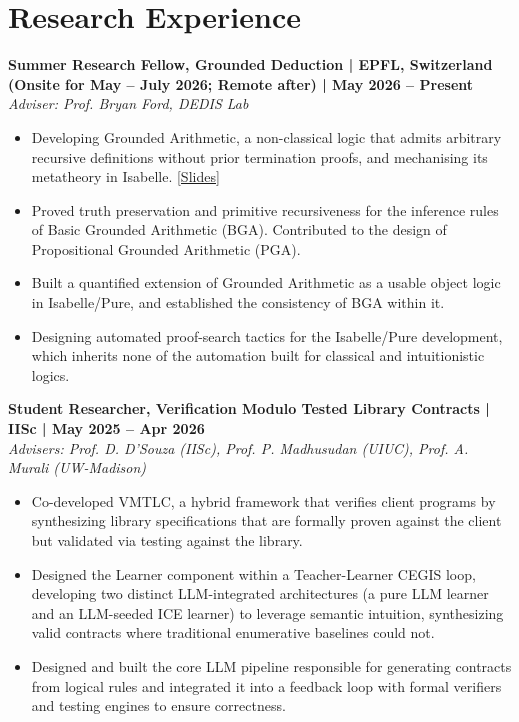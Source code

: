 \documentclass[a4paper,10pt]{article}
\newcommand{\role}[4]{
    \noindent \textbf{#1 | #3 | #2} \\
    \textit{#4}
}
\begin{document}
\section*{Research Experience}

\role{Summer Research Fellow, Grounded Deduction}{May 2026 -- Present}{EPFL, Switzerland (Onsite for May – July 2026; Remote after)}{Adviser: Prof. Bryan Ford, DEDIS Lab}
\begin{itemize}
    \item Developing Grounded Arithmetic, a non-classical logic that admits arbitrary recursive definitions without prior termination proofs, and mechanising its metatheory in Isabelle. \href{https://omar826.github.io/grounded.pdf}{[Slides]}
    \item Proved truth preservation and primitive recursiveness for the inference rules of Basic Grounded Arithmetic (BGA). Contributed to the design of Propositional Grounded Arithmetic (PGA).
    \item Built a quantified extension of Grounded Arithmetic as a usable object logic in Isabelle/Pure, and established the consistency of BGA within it.
    \item Designing automated proof-search tactics for the Isabelle/Pure development, which inherits none of the automation built for classical and intuitionistic logics.
\end{itemize}

\vspace{5pt}
\role{Student Researcher, Verification Modulo Tested Library Contracts}{May 2025 -- Apr 2026}{IISc}{Advisers: Prof. D. D'Souza (IISc), Prof. P. Madhusudan (UIUC), Prof. A. Murali (UW-Madison)}
\begin{itemize}
    \item Co-developed VMTLC, a hybrid framework that verifies client programs by synthesizing library specifications that are formally proven against the client but validated via testing against the library.
    \item Designed the Learner component within a Teacher-Learner CEGIS loop, developing two distinct LLM-integrated architectures (a pure LLM learner and an LLM-seeded ICE learner) to leverage semantic intuition, synthesizing valid contracts where traditional enumerative baselines could not.
    \item Designed and built the core LLM pipeline responsible for generating contracts from logical rules and integrated it into a feedback loop with formal verifiers and testing engines to ensure correctness.
\end{itemize}
\end{document}
